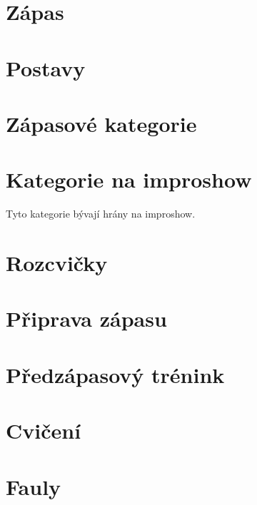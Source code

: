 \documentclass[a4paper,10pt,openany]{book}
\begin{document}
\chapter{Zápas}







\chapter{Postavy}



\chapter{Zápasové kategorie}
\label{zápasové kategorie}
\label{:kategorie:zápasové kategorie}



\chapter{Kategorie na improshow}\label{další kategorie}
\label{:kategorie:kategorie na improshow}
Tyto kategorie bývají hrány na improshow.


\chapter{Rozcvičky}\label{rozcvičky}
\label{:kategorie:rozcvičky}





\chapter{Připrava zápasu}


\chapter{Předzápasový trénink}


\chapter{Cvičení}


\chapter{Fauly}\label{fauly}

\label{:kategorie:fauly}
 
 
\end{document}

